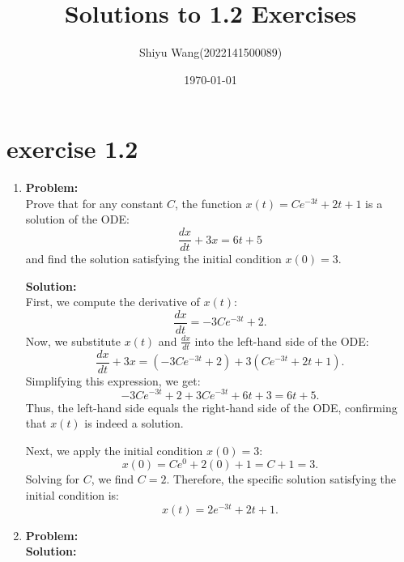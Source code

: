 \documentclass[12pt]{article}
\title{Solutions to 1.2 Exercises}
\author{Shiyu Wang(2022141500089)}
\date{\today}
\begin{document}
\maketitle

\section{exercise 1.2}

\begin{enumerate}[label=\textbf{Exercise \arabic*:}]
    \item
    \textbf{Problem:} \\
    Prove that for any constant $C$, the function $x(t)=Ce^{-3t}+2t+1$ is a solution of the ODE:
    $$\frac{dx}{dt}+3x=6t+5$$
    and find the solution satisfying the initial condition $x(0)=3$.
    
    \textbf{Solution:} \\
    First, we compute the derivative of $x(t)$:
    $$\frac{dx}{dt} = -3Ce^{-3t}+2.$$
    Now, we substitute $x(t)$ and $\frac{dx}{dt}$ into the left-hand side of the ODE:
    $$\frac{dx}{dt}+3x = (-3Ce^{-3t}+2)+3(Ce^{-3t}+2t+1).$$
    Simplifying this expression, we get:
    $$-3Ce^{-3t}+2+3Ce^{-3t}+6t+3 = 6t+5.$$
    Thus, the left-hand side equals the right-hand side of the ODE, confirming that $x(t)$ is indeed a solution.

    Next, we apply the initial condition $x(0)=3$:
    $$x(0) = Ce^{0}+2(0)+1 = C+1 = 3.$$
    Solving for $C$, we find $C=2$. Therefore, the specific solution satisfying the initial condition is:
    $$x(t) = 2e^{-3t}+2t+1.$$

    \item
    \textbf{Problem:} \\
    


    \textbf{Solution:} \\
    
    


    \vspace{1em}

\end{enumerate}
\end{document}

